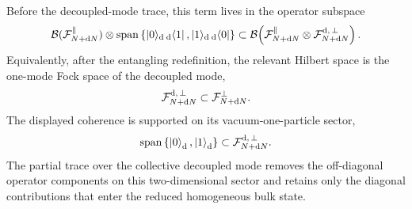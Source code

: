\documentclass{article}
\def\cF{{\cal F}}
\numberwithin{equation}{section}
\begin{document}
	Before the decoupled-mode trace, this term lives in the operator subspace
	\begin{equation}
		\mathcal B(\cF_{N+\dd N}^\parallel) \otimes {\rm span} \left\{ \ket{0}\!{}_{\rm d}\,{}_{\rm d}\!\bra{1}, \ket{1}\!{}_{\rm d}\,{}_{\rm d}\!\bra{0} \right\} \subset \mathcal B\!\left(\cF_{N+\dd N}^\parallel\otimes\cF^{\rm d,\,\perp}_{N+\dd N}\right).
		\label{eq:DiscardedFockSubspaceApp}
	\end{equation}
	Equivalently, after the entangling redefinition, the relevant Hilbert space is the one-mode Fock space of the decoupled mode,
	\begin{equation}
		\cF^{\rm d,\,\perp}_{N+\dd N} \subset \cF_{N+\dd N}^\perp .
	\end{equation}
	The displayed coherence is supported on its vacuum-one-particle sector,
	\begin{equation}
		{\rm span} \left\{ \ket{0}_{\rm d},\ket{1}_{\rm d} \right\} \subset \cF^{\rm d,\,\perp}_{N+\dd N}.
		\label{eq:DecoupledModeFockSubspaceApp}
	\end{equation}
	The partial trace over the collective decoupled mode removes the off-diagonal operator components on this two-dimensional sector and retains only the diagonal contributions that enter the reduced homogeneous bulk state.
\end{document}
